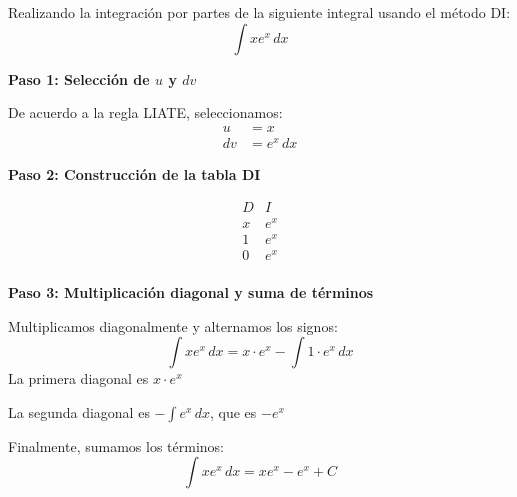\begin{example}
    
    Realizando la integración por partes de la siguiente integral usando el método DI:
\begin{equation}
    \int x e^x \, dx
\end{equation}
    
    \textbf{Paso 1: Selección de \( u \) y \( dv \)}
    
    De acuerdo a la regla LIATE, seleccionamos:
    \begin{align*}
    u &= x \\
    dv &= e^x \, dx
    \end{align*}
    
    \textbf{Paso 2: Construcción de la tabla DI}

    \[
    \begin{array}{c|c}
    D & I \\
    \hline
    x & e^x \\
    1 & e^x \\
    0 & e^x \\
    \end{array}
    \]
    
    \textbf{Paso 3: Multiplicación diagonal y suma de términos}
    
    Multiplicamos diagonalmente y alternamos los signos:
    \begin{equation*}
        \int x e^x \, dx = x \cdot e^x - \int 1 \cdot e^x \, dx
    \end{equation*}
    La primera diagonal es \( x \cdot e^x \)
    
    La segunda diagonal es \(-\int e^x \, dx\), que es \(-e^x\)
    
    Finalmente, sumamos los términos:
    \begin{equation*}
        \int x e^x \, dx = x e^x - e^x + C
    \end{equation*}
\end{example}

